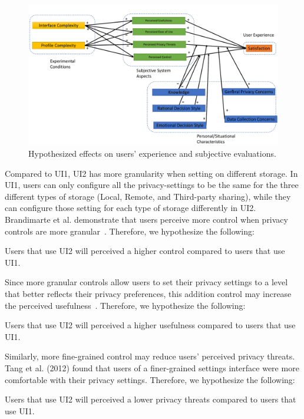 \begin{figure}
	\centering
	\includegraphics[width=\textwidth]{figures/uimodel.pdf}
	\caption{Hypothesized effects on users’ experience and subjective evaluations.}
	\label{fig:uimodel}
\end{figure}

Compared to UI1, UI2 has more granularity when setting on different storage. In UI1, users can only configure all the privacy-settings to be the same for the three different types of storage (Local, Remote, and Third-party sharing), while they can configure those setting for each type of storage differently in UI2. Brandimarte et al. demonstrate that users perceive more control when privacy controls are more granular~\cite{brandimarte2013misplaced}. Therefore, we hypothesize the following:
\theoremgroup
\begin{theorem}
	Users that use UI2 will perceived  a higher control compared to users that use UI1.
\end{theorem}

Since more granular controls allow users to set their privacy settings to a level that better reflects their privacy preferences, this addition control may increase the perceived usefulness~\cite{tang2012implications, al2016modeling}. Therefore, we hypothesize the following:
\begin{theorem}
	Users that use UI2 will perceived a higher usefulness compared to users that use UI1.
\end{theorem}

Similarly, more fine-grained control may reduce users' perceived privacy threats. Tang et al. (2012) found that users of a finer-grained settings interface were more comfortable with their privacy settings. Therefore, we hypothesize the following:
\begin{theorem}
	Users that use UI2 will perceived a lower privacy threats compared to users that use UI1.
\end{theorem}

